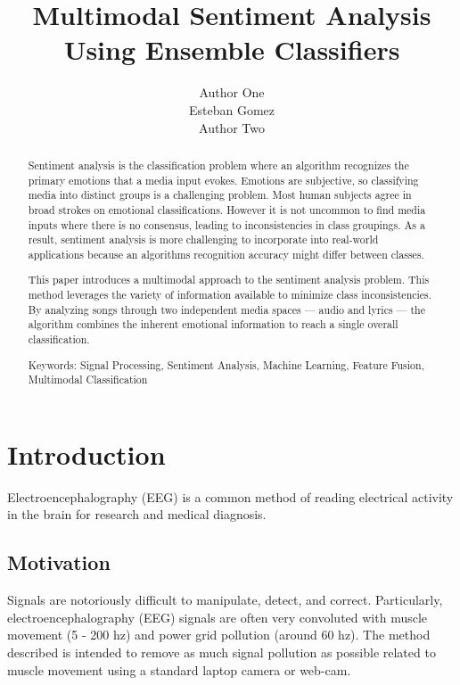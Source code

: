 \documentclass{acm_proc_article-sp}
\begin{document}
\title{Multimodal Sentiment Analysis Using Ensemble Classifiers}

\author{
\alignauthor Author One \\
\alignauthor Esteban Gomez\\
\alignauthor Author Two\\
}

\maketitle
\begin{abstract}
Sentiment analysis is the classification problem where an algorithm 
recognizes the primary emotions that a media input evokes. 
Emotions are subjective, so classifying media into distinct groups 
is a challenging problem. Most human subjects agree in broad 
strokes on emotional classifications. However it is not uncommon
 to find media inputs where there is no consensus, leading to 
 inconsistencies in class groupings. As a result, sentiment analysis 
 is more challenging to incorporate into real-world applications 
 because an algorithms recognition accuracy might differ between classes. 
 
This paper introduces a multimodal approach to the sentiment analysis problem. 
This method leverages the variety of information available 
to minimize class inconsistencies. By analyzing songs through two 
independent media spaces --- audio and lyrics --- the algorithm combines 
the inherent emotional information to reach a single overall classification. 

Keywords: Signal Processing, Sentiment Analysis, Machine Learning, 
Feature Fusion, Multimodal Classification

\end{abstract}

\section{Introduction}
Electroencephalography (EEG) is a common method of reading electrical
activity in the brain for research and medical diagnosis.

\subsection{Motivation}\label{motivation}
Signals are notoriously difficult to manipulate, detect, and
correct. Particularly, electroencephalography (EEG) signals are often
very convoluted with muscle movement (5 - 200 hz) and power grid
pollution (around 60 hz). The method described is intended to remove
as much signal pollution as possible related to muscle movement using
a standard laptop camera or web-cam.
\end{document}
